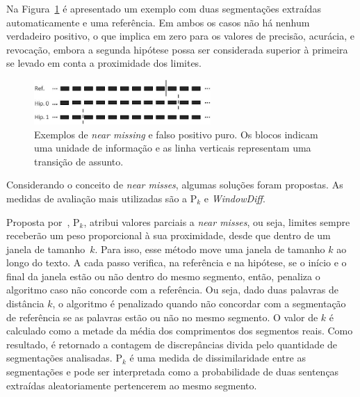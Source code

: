 Na Figura~\ref{fig:exemplosegmentacaozoom} é apresentado um exemplo com duas segmentações extraídas automaticamente e uma referência. Em ambos os casos não há nenhum verdadeiro positivo, o que implica em zero para os valores de precisão, acurácia, e revocação, embora a segunda hipótese possa ser considerada superior à primeira se levado em conta a proximidade dos limites.


  \begin{figure}[!h]

	\centering
	\includegraphics[width=0.6\textwidth]{conteudo/capitulos/figs/windiffzoom.jpg}
	\caption{Exemplos de \textit{near missing} e falso positivo puro. Os blocos indicam uma unidade de informação e as linha verticais representam uma transição de assunto. }
	\label{fig:exemplosegmentacaozoom}

  \end{figure}
  

Considerando o conceito de \textit{near misses}, algumas soluções foram propostas. As medidas de avaliação mais utilizadas são a P$_k$ e \textit{WindowDiff}.
% 
% 
% 
% 

 
Proposta por~\cite{Beeferman1999}, P$_k$, atribui valores parciais a \textit{near misses}, ou seja, limites sempre receberão um peso proporcional à sua proximidade, desde que dentro de um janela de tamanho~$k$.  Para isso, esse método move uma janela de tamanho $k$ ao longo do texto.  A cada passo verifica, na referência e na hipótese, se o início e o final da janela estão ou não dentro do mesmo segmento, então, penaliza o algoritmo caso não concorde com a referência. Ou seja, dado duas palavras de distância $k$, o algoritmo é penalizado quando não concordar com a segmentação de referência se as palavras estão ou não no mesmo segmento.  O valor de $k$ é calculado como a metade da média dos comprimentos dos segmentos reais. Como resultado, é retornado a contagem de discrepâncias divida pelo quantidade de segmentações analisadas.  P$_k$ é uma medida de dissimilaridade entre as segmentações e pode ser interpretada como a probabilidade de duas sentenças extraídas aleatoriamente pertencerem ao mesmo segmento.




